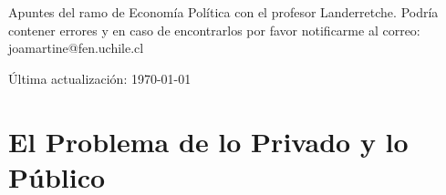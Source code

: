 \documentclass[12pt]{book}
\begin{document}
Apuntes del ramo de Economía Política con el profesor Landerretche. Podría contener errores y en caso de encontrarlos por favor notificarme al correo: joamartine@fen.uchile.cl

Última actualización: \today

\newpage

\setcounter{chapter}{2}

\chapter{El Problema de lo Privado y lo Público}





\begin{appendices}
    
\end{appendices}
\end{document}
